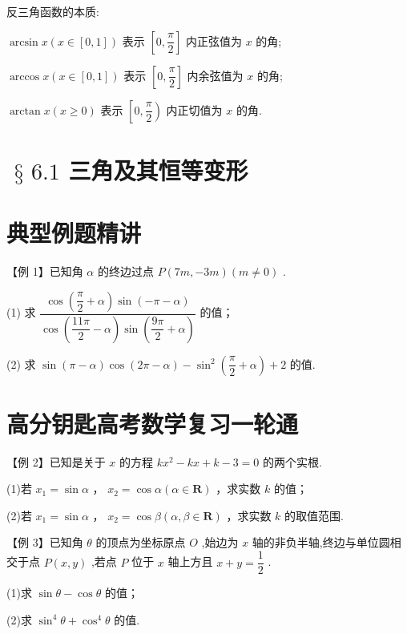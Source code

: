 反三角函数的本质:

$\arcsin x\left( {x \in  \left\lbrack  {0,1}\right\rbrack  }\right)$ 表示 $\left\lbrack  {0,\dfrac{\pi }{2}}\right\rbrack$ 内正弦值为 $x$ 的角;

$\arccos x\left( {x \in  \left\lbrack  {0,1}\right\rbrack  }\right)$ 表示 $\left\lbrack  {0,\dfrac{\pi }{2}}\right\rbrack$ 内余弦值为 $x$ 的角;

$\arctan x\left( {x \geq  0}\right)$ 表示 $\left\lbrack  {0,\dfrac{\pi }{2}}\right)$ 内正切值为 $x$ 的角.

\section*{$\text{ § }{6.1}$ 三角及其恒等变形}

\section*{典型例题精讲}

【例 1】已知角 $\alpha$ 的终边过点 $P\left( {{7m}, - {3m}}\right) \left( {m \neq  0}\right)$ .

(1) 求 $\dfrac{\cos \left( {\dfrac{\pi }{2} + \alpha }\right) \sin \left( {-\pi  - \alpha }\right) }{\cos \left( {\dfrac{11\pi }{2} - \alpha }\right) \sin \left( {\dfrac{9\pi }{2} + \alpha }\right) }$ 的值；

(2) 求 $\sin \left( {\pi  - \alpha }\right) \cos \left( {{2\pi } - \alpha }\right)  - {\sin }^{2}\left( {\dfrac{\pi }{2} + \alpha }\right)  + 2$ 的值.

\section*{高分钥匙高考数学复习一轮通}

【例 2】已知是关于 $x$ 的方程 $k{x}^{2} - {kx} + k - 3 = 0$ 的两个实根.

(1)若 ${x}_{1} = \sin \alpha$ ， ${x}_{2} = \cos \alpha \left( {\alpha  \in  \mathbf{R}}\right)$ ，求实数 $k$ 的值；

(2)若 ${x}_{1} = \sin \alpha$ ， ${x}_{2} = \cos \beta \left( {\alpha ,\beta  \in  \mathbf{R}}\right)$ ，求实数 $k$ 的取值范围.

【例 3】已知角 $\theta$ 的顶点为坐标原点 $O$ ,始边为 $x$ 轴的非负半轴,终边与单位圆相交于点 $P\left( {x,y}\right)$ ,若点 $P$ 位于 $x$ 轴上方且 $x + y = \dfrac{1}{2}$ .

(1)求 $\sin \theta  - \cos \theta$ 的值；

(2)求 ${\sin }^{4}\theta  + {\cos }^{4}\theta$ 的值.

